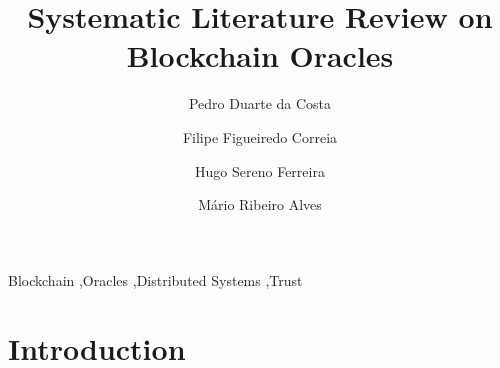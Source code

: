 \documentclass[final,3p,12pt,twocolumn]{elsarticle}
\begin{document}
\begin{frontmatter}




  \title{\textbf{Systematic Literature Review on Blockchain Oracles} }

  \author[add1]{Pedro Duarte da Costa}
  \author[add1]{Filipe Figueiredo Correia}
  \author[add1]{Hugo Sereno Ferreira}
  \author[add2]{Mário Ribeiro Alves}

  \address[add1]{Faculty of Engineering, University of Porto, Oporto, Portugal}
  \address[add2]{BRPX - Bright Development Studio, S.A. - BRPX S.A}


  \begin{abstract}


  \end{abstract}
  \begin{keyword}
    Blockchain \sep Oracles \sep Distributed Systems \sep Trust

  \end{keyword}



\end{frontmatter}



\section{Introduction}
\end{document}
